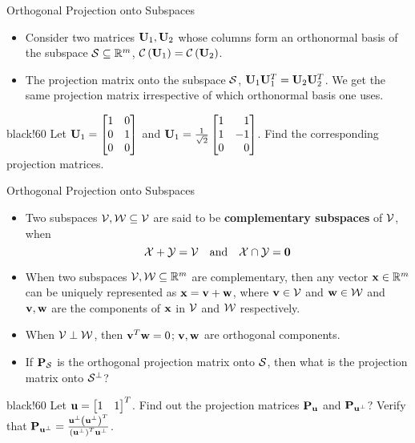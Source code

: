 \documentclass[aspectratio=169]{beamer}
\def\mf{\ensuremath\mathbf}
\def\mb{\ensuremath\mathbb}
\def\mc{\ensuremath\mathcal}
\def\lp{\ensuremath\left(}
\def\rp{\ensuremath\right)}
\def\bmx{\ensuremath\begin{bmatrix*}[r]}
\def\emx{\ensuremath\end{bmatrix*}}
\newcommand{\demoex}[2]{\onslide<#1->\begin{color}{black!60} #2 \end{color}}
\begin{document}
\begin{frame}[t]{Orthogonal Projection onto Subspaces}

\begin{itemize}
    \item Consider two matrices $\mf{U}_1, \mf{U}_2$ whose columns form an  orthonormal basis of the subspace $\mc{S} \subseteq \mb{R}^m $, $\mc{C}\lp\mf{U}_1\rp = \mc{C}\lp\mf{U}_2\rp$.

    \item The projection matrix onto the subspace $\mc{S}$, $\mf{U}_1\mf{U}_1^T = \mf{U}_2\mf{U}_2^T$. We get the same projection matrix irrespective of which orthonormal basis one uses.
\end{itemize}
\demoex{2}{
    Let $\mf{U}_1 = \bmx1 & 0\\0 & 1\\0 & 0\emx$ and $\mf{U}_1 = \frac{1}{\sqrt{2}}\bmx1 & 1\\1 & -1\\0 & 0\emx$. Find the corresponding projection matrices.
}
\end{frame}

\begin{frame}[t]{Orthogonal Projection onto Subspaces}

\begin{itemize}
    \item Two subspaces $\mc{V}, \mc{W} \subseteq \mc{V}$ are said to be \textbf{complementary subspaces} of $\mc{V}$, when
    \[ \mc{X} + \mc{Y} = \mc{V} \quad \text{and} \quad \mc{X}\cap\mc{Y} = \mf{0} \] 

    \item When two subspaces $\mc{V}, \mc{W} \subseteq \mb{R}^m$ are complementary, then any vector $\mf{x} \in \mb{R}^m$ can be uniquely represented as $\mf{x} = \mf{v} + \mf{w}$, where $\mf{v} \in \mc{V}$ and   $\mf{w} \in \mc{W}$ and $\mf{v}, \mf{w}$ are the components of $\mf{x}$ in $\mc{V}$ and $\mc{W}$ respectively.

    \item When $\mc{V} \perp \mc{W}$, then $\mf{v}^T\mf{w} = 0$; $\mf{v}, \mf{w}$ are orthogonal components. 

    \item If $\mf{P}_\mc{S}$ is the orthogonal projection matrix onto $\mc{S}$, then what is the projection matrix onto $\mc{S}^\perp$?
\end{itemize}
\demoex{2}{
    Let $\mf{u} = \bmx 1 & 1 \emx^T$. Find out the projection matrices $\mf{P}_\mf{u}$ and $\mf{P}_{\mf{u}^\perp}$? Verify that $\mf{P}_{\mf{u}^\perp} = \frac{\mf{u}^\perp\lp{\mf{u}^\perp}\rp^T}{\lp{\mf{u}^\perp}\rp^T\mf{u}^\perp}$.
}
\end{frame}
\end{document}
